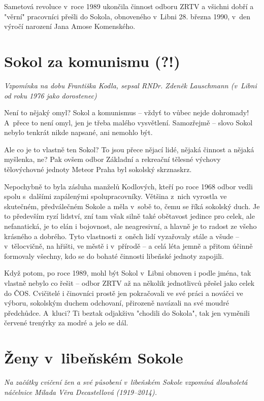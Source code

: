 \documentclass[a5paper, 11pt, twoside]{article}
\begin{document}
Sametová revoluce v~roce 1989 ukončila činnost odboru ZRTV a všichni
dobří a "věrní" pracovníci přešli do Sokola, obnoveného v~Libni 28.
března 1990, v~den výročí narození Jana Amose Komenského.

\section{Sokol za komunismu (?!)}

\textit{Vzpomínka na dobu Františka Kodla, sepsal RNDr. Zdeněk Lauschmann
(v~Libni od roku 1976 jako dorostenec)}

Není to nějaký omyl? Sokol a komunismus -- vždyť to vůbec nejde
dohromady! A~přece to není omyl, jen je třeba malého vysvětlení.
Samozřejmě -- slovo Sokol nebylo tenkrát nikde napsané, ani nemohlo být.

Ale co je to vlastně ten Sokol? To jsou přece nějací lidé, nějaká
činnost a nějaká myšlenka, ne? Pak ovšem odbor Základní a rekreační
tělesné výchovy tělovýchovné jednoty Meteor Praha byl sokolský
skrznaskrz.

Nepochybně to byla zásluha manželů Kodlových, kteří po roce 1968 odbor
vedli spolu s~dalšími zapálenými spolupracovníky. Většina z~nich
vyrostla ve skutečném, předválečném Sokole a měla v~sobě to, čemu se
říká sokolský duch. Je to především ryzí lidství, zní tam však silně
také obětavost jedince pro celek, ale nefanatická, je to elán i
bojovnost, ale neagresivní, a hlavně je to radost ze všeho krásného a
dobrého. Tyto vlastnosti z~oněch lidí vyzařovaly stále a všude --
v~tělocvičně, na hřišti, ve městě i v~přírodě -- a celá léta jemně a
přitom účinně formovaly všechny, kdo se do bohaté činnosti libeňské
jednoty zapojili.

Když potom, po roce 1989, mohl být Sokol v~Libni obnoven i podle jména,
tak vlastně nebylo co řešit -- odbor ZRTV až na několik jednotlivců
přešel jako celek do ČOS. Cvičitelé i činovníci prostě jen pokračovali
ve své práci a nováčci ve výboru, sokolským duchem odchovaní, přirozeně
navázali na své moudré předchůdce. A~kluci? Ti beztak odjakživa "chodili
do Sokola", tak jen vyměnili červené trenýrky za modré a jelo se dál.

\section{Ženy v~libeňském
Sokole}

\textit{Na začátky cvičení žen a své působení v~libeňském Sokole vzpomíná
dlouholetá náčelnice Milada Věra Decastellová (1919--2014).}
\end{document}

